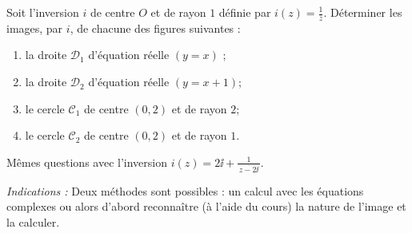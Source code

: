 \documentclass[11pt,class=report,crop=false]{standalone}
\newcommand{\inversion}{i}
\begin{document}
\begin{exercicecours}[Inversion]

Soit l'inversion $\inversion$ de centre $O$ et de rayon $1$ définie par $\inversion(z) = \frac{1}{\bar z}$.
Déterminer les images, par $\inversion$, de chacune des figures suivantes :


\begin{enumerate}
 \item la droite $\mathcal{D}_1$ d'équation réelle $(y=x)$ ;
 \item la droite $\mathcal{D}_2$ d'équation réelle $(y=x+1)$;
 \item le cercle $\mathcal{C}_1$ de centre $(0,2)$ et de rayon $2$;
 \item le cercle $\mathcal{C}_2$ de centre $(0,2)$ et de rayon $1$.
\end{enumerate}


Mêmes questions avec l'inversion $\inversion(z) = 2\ii + \frac{1}{\,\overline{z-2\ii}\,}$.

\emph{Indications :} Deux méthodes sont possibles : un calcul avec les équations complexes
ou alors d'abord reconnaître (à l'aide du cours) la nature de l'image et la calculer.
\end{exercicecours}
\end{document}
